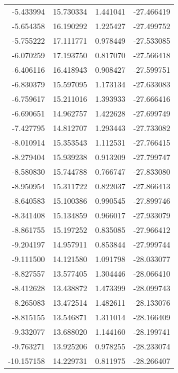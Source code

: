 \begin{tabular}{rrrr}
       -5.433994 &        15.730334 &    1.441041 & -27.466419 \\
       -5.654358 &        16.190292 &    1.225427 & -27.499752 \\
       -5.755222 &        17.111771 &    0.978449 & -27.533085 \\
       -6.070259 &        17.193750 &    0.817070 & -27.566418 \\
       -6.406116 &        16.418943 &    0.908427 & -27.599751 \\
       -6.830379 &        15.597095 &    1.173134 & -27.633083 \\
       -6.759617 &        15.211016 &    1.393933 & -27.666416 \\
       -6.690651 &        14.962757 &    1.422628 & -27.699749 \\
       -7.427795 &        14.812707 &    1.293443 & -27.733082 \\
       -8.010914 &        15.353543 &    1.112531 & -27.766415 \\
       -8.279404 &        15.939238 &    0.913209 & -27.799747 \\
       -8.580830 &        15.744788 &    0.766747 & -27.833080 \\
       -8.950954 &        15.311722 &    0.822037 & -27.866413 \\
       -8.640583 &        15.100386 &    0.990545 & -27.899746 \\
       -8.341408 &        15.134859 &    0.966017 & -27.933079 \\
       -8.861755 &        15.197252 &    0.835085 & -27.966412 \\
       -9.204197 &        14.957911 &    0.853844 & -27.999744 \\
       -9.111500 &        14.121580 &    1.091798 & -28.033077 \\
       -8.827557 &        13.577405 &    1.304446 & -28.066410 \\
       -8.412628 &        13.438872 &    1.473399 & -28.099743 \\
       -8.265083 &        13.472514 &    1.482611 & -28.133076 \\
       -8.815155 &        13.546871 &    1.311014 & -28.166409 \\
       -9.332077 &        13.688020 &    1.144160 & -28.199741 \\
       -9.763271 &        13.925206 &    0.978255 & -28.233074 \\
      -10.157158 &        14.229731 &    0.811975 & -28.266407 \\

\end{tabular}

